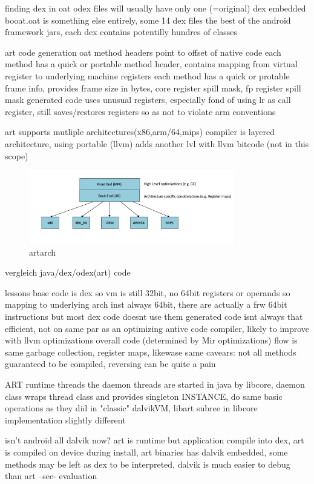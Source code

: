 finding dex in oat
odex files will usually have only one (=original) dex embedded
booat.oat is something else entirely, some 14 dex files the best of the android framework jars, each dex contains potentilly hundres of classes

art code generation
oat method headers point to offset of native code
each method has a quick or portable method header, contains mapping from virtual register to underlying machine registers
each method has a quick or protable frame info, provides frame size in bytes, core register spill mask, fp register spill mask
generated code uses unusual registers, especially fond of using lr as call register, still saves/restores registers so as not to violate arm conventions
\newline

art supports mutliple architectures(x86,arm/64,mips)
compiler is layered architecture, using portable (llvm) adds another lvl with llvm bitcode (not in this scope)
\begin{figure}[h]
    \centering
    \includegraphics[width=0.8\textwidth]{data/artarch.png}
    \caption{artarch}
    \label{fig:artarch}
\end{figure}

vergleich java/dex/odex(art) code
\newline

lessons
base code is dex so vm is still 32bit, no 64bit registers or operands so mapping to underlying arch inst always 64bit, there are actually a frw 64bit instructions but most dex code doesnt use them
generated code isnt always that efficient, not on same par as an optimizing antive code compiler, likely to improve with llvm optimizations
overall code (determined by Mir optimizations) flow is same
garbage collection, register maps, likewase same
cavears: not all methods guaranteed to be compiled, reversing can be quite a pain
\newline

ART runtime threads
the daemon threads are started in java by libcore, daemon class wraps thread class and provides singleton INSTANCE, do same basic operations as they did in "classic" dalvikVM, libart subree in libcore implementation slightly different
\newline

isn't android all dalvik now?
art is runtime but application compile into dex, art is compiled on device during install, art binaries has dalvik embedded, some methods may be left as dex to be interpreted, dalvik is much easier to debug than art --see- evaluation \newline
\cite{andevconDalvikART}
%
